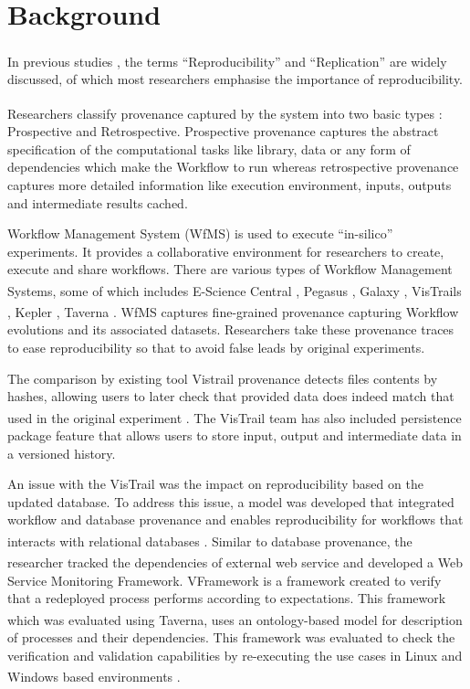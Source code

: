 \documentclass[10pt,conference,twocolumn]{IEEEtran}
\begin{document}
\section{Background}
In previous studies \textsuperscript{\cite{Schwab2000,Barnes2010,Mesirov2010,Morin2012,Wilson2014,Vitek2011,Drummond2009,Feitelson2015}}, the terms \enquote{Reproducibility} and \enquote{Replication} are widely discussed, of which most researchers emphasise the importance of reproducibility. 

Researchers classify provenance captured by the system into two basic types \textsuperscript{\cite{2010}} : Prospective and Retrospective. Prospective provenance captures the abstract specification of the computational tasks like library, data or any form of dependencies which make the Workflow to run whereas retrospective provenance captures more detailed information like execution environment, inputs, outputs and intermediate results cached. 

Workflow Management System (WfMS) is used to execute \enquote{in-silico} experiments. It provides a collaborative environment for researchers to create, execute and share workflows. There are various types of Workflow Management Systems, some of which includes E-Science Central \textsuperscript{\cite{Hiden2012}}, Pegasus \textsuperscript{\cite{kim2008}}, Galaxy \textsuperscript{\cite{Galaxy}}, VisTrails \textsuperscript{\cite{VisTrails}}, Kepler \textsuperscript{\cite{Kepler}}, Taverna \textsuperscript{\cite{Taverna}}. WfMS captures fine-grained provenance capturing Workflow evolutions and its associated datasets. Researchers take these provenance traces to ease reproducibility so that to avoid false leads by original experiments. 

The comparison by existing tool Vistrail provenance detects files contents by hashes, allowing users to later check that provided data does indeed match that used in the original experiment \textsuperscript{\cite{koop2010}}. The VisTrail team has also included persistence package feature that allows users to store input, output and intermediate data in a versioned history. 

An issue with the VisTrail was the impact on reproducibility based on the updated database. To address this issue, a model was developed that integrated workflow and database provenance and enables reproducibility for workflows that interacts with relational databases \textsuperscript{\cite{granularities2012}}. Similar to database provenance, the researcher \textsuperscript{\cite{miksa2015}} tracked the dependencies of external web service and developed a Web Service Monitoring Framework. VFramework is a framework created to verify that a redeployed process performs according to expectations. This framework which was evaluated using Taverna, uses an ontology-based model \textsuperscript{\cite{mcguinness2013}} for description of processes and their dependencies. This framework was evaluated to check the verification and validation capabilities by re-executing the use cases in Linux and Windows based environments \textsuperscript{\cite{miksa2013}}. 
\end{document}
